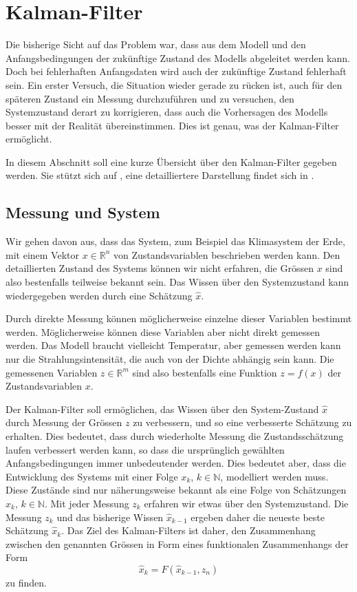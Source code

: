 %
%
%
\section{Kalman-Filter\label{section:kalman-filter}}
%
Die bisherige Sicht auf das Problem war, dass aus dem Modell und den
Anfangsbedingungen der zukünftige Zustand des Modells abgeleitet werden
kann.
Doch bei fehlerhaften Anfangsdaten wird auch der zukünftige Zustand
fehlerhaft sein.
Ein erster Versuch, die Situation wieder gerade zu rücken ist, auch für
den späteren Zustand ein Messung durchzuführen und zu versuchen,
den Systemzustand derart zu korrigieren, dass auch die Vorhersagen des
Modells besser mit der Realität übereinstimmen.
Dies ist genau, was der Kalman-Filter ermöglicht.

In diesem Abschnitt soll eine kurze Übersicht über den Kalman-Filter
gegeben werden.
Sie stützt sich auf \cite{skript:catlin}, eine detailliertere Darstellung
findet sich in \cite[Kapitel 8]{skript:wrstatskript}.

\subsection{Messung und System\label{subsection:messung und system}}
Wir gehen davon aus, dass das System, zum Beispiel das Klimasystem der Erde,
mit einem Vektor $x\in\mathbb R^n$ von Zustandsvariablen beschrieben werden
kann.
Den detaillierten Zustand des Systems können wir nicht erfahren, die
Grössen $x$ sind also bestenfalls teilweise bekannt sein.
Das Wissen über den Systemzustand kann wiedergegeben werden
durch eine Schätzung $\hat x$.

Durch direkte Messung können möglicherweise einzelne dieser Variablen
bestimmt werden.
Möglicherweise können diese Variablen aber nicht direkt gemessen werden.
Das Modell braucht vielleicht Temperatur, aber gemessen werden kann nur
die Strahlungsintensität, die auch von der Dichte abhängig sein kann.
Die gemessenen Variablen $z\in\mathbb R^m$ sind also bestenfalls eine
Funktion $z=f(x)$ der Zustandsvariablen $x$.

Der Kalman-Filter soll ermöglichen, das Wissen über den System-Zustand
$\hat x$ durch Messung der Grössen $z$ zu verbessern, und so eine
verbesserte Schätzung zu erhalten.
Dies bedeutet, dass durch wiederholte Messung die Zustandsschätzung
laufen verbessert werden kann, so dass die ursprünglich gewählten 
Anfangsbedingungen immer unbedeutender werden.
Dies bedeutet aber, dass die Entwicklung des Systems mit einer Folge
$x_k$, $k\in\mathbb N$, modelliert werden muss.
Diese Zustände sind nur näherungsweise bekannt als eine Folge
von Schätzungen $\hat{x}_k$, $k\in\mathbb N$.
Mit jeder Messung $z_k$ erfahren wir etwas über den Systemzustand.
Die Messung $z_k$ und das bisherige Wissen $\hat{x}_{k-1}$ ergeben
daher die neueste beste Schätzung $\hat{x}_k$.
Das Ziel des Kalman-Filters ist daher, den Zusammenhang zwischen den
genannten Grössen in Form eines funktionalen Zusammenhangs der Form
\begin{equation}
\hat{x}_k = F(\hat{x}_{k-1},z_n)
\label{skript:filterbasis}
\end{equation}
zu finden.


